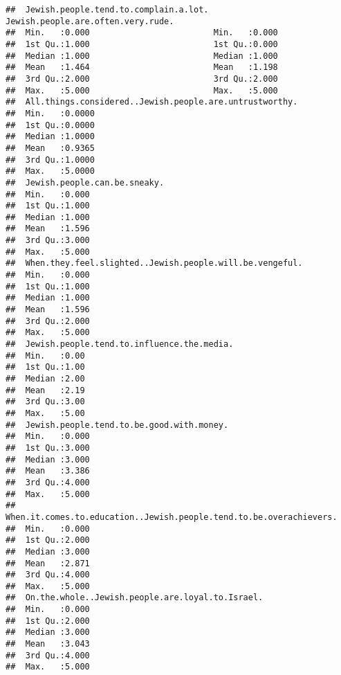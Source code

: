 \documentclass[
  doc,draftall]{apa6}
\begin{document}
\begin{verbatim}
##  Jewish.people.tend.to.complain.a.lot. Jewish.people.are.often.very.rude.
##  Min.   :0.000                         Min.   :0.000                     
##  1st Qu.:1.000                         1st Qu.:0.000                     
##  Median :1.000                         Median :1.000                     
##  Mean   :1.464                         Mean   :1.198                     
##  3rd Qu.:2.000                         3rd Qu.:2.000                     
##  Max.   :5.000                         Max.   :5.000                     
##  All.things.considered..Jewish.people.are.untrustworthy.
##  Min.   :0.0000                                         
##  1st Qu.:0.0000                                         
##  Median :1.0000                                         
##  Mean   :0.9365                                         
##  3rd Qu.:1.0000                                         
##  Max.   :5.0000                                         
##  Jewish.people.can.be.sneaky.
##  Min.   :0.000               
##  1st Qu.:1.000               
##  Median :1.000               
##  Mean   :1.596               
##  3rd Qu.:3.000               
##  Max.   :5.000               
##  When.they.feel.slighted..Jewish.people.will.be.vengeful.
##  Min.   :0.000                                           
##  1st Qu.:1.000                                           
##  Median :1.000                                           
##  Mean   :1.596                                           
##  3rd Qu.:2.000                                           
##  Max.   :5.000                                           
##  Jewish.people.tend.to.influence.the.media.
##  Min.   :0.00                              
##  1st Qu.:1.00                              
##  Median :2.00                              
##  Mean   :2.19                              
##  3rd Qu.:3.00                              
##  Max.   :5.00                              
##  Jewish.people.tend.to.be.good.with.money.
##  Min.   :0.000                            
##  1st Qu.:3.000                            
##  Median :3.000                            
##  Mean   :3.386                            
##  3rd Qu.:4.000                            
##  Max.   :5.000                            
##  When.it.comes.to.education..Jewish.people.tend.to.be.overachievers.
##  Min.   :0.000                                                      
##  1st Qu.:2.000                                                      
##  Median :3.000                                                      
##  Mean   :2.871                                                      
##  3rd Qu.:4.000                                                      
##  Max.   :5.000                                                      
##  On.the.whole..Jewish.people.are.loyal.to.Israel.
##  Min.   :0.000                                   
##  1st Qu.:2.000                                   
##  Median :3.000                                   
##  Mean   :3.043                                   
##  3rd Qu.:4.000                                   
##  Max.   :5.000
\end{verbatim}
\end{document}

